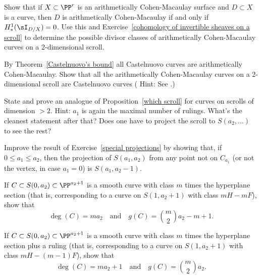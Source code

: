 \begin{exercise}
 Show that if $X\subset\PP^r$ is an arithmetically Cohen-Macaulay surface
and $D\subset X$ is a curve, then $D$ is arithmetically Cohen-Macaulay if and only if
$H^1_*(\sI_{D/X}) = 0$. Use this and Exercise~\ref{cohomology of invertible sheaves on a scroll} to determine the
possible divisor classes of arithmetically Cohen-Macaulay curves on a 2-dimensional scroll.
\end{exercise}

\begin{exercise}\label{Castelnuovo scrolls}
By Theorem~\ref{Castelnuovo's bound} all Castelnuovo curves are arithmetically Cohen-Macaulay.
Show that all the arithmetically Cohen-Macaulay curves on a 2-dimensional scroll are
Castelnuovo curves ( Hint: See \cite[Section 3c]{MR685427}.)
\end{exercise}


\begin{exercise}
State and prove an analogue of Proposition~\ref{which scroll} for curves on scrolls of dimension $>2$.
Hint: $a_1$ is again the maximal number of rulings. What's the cleanest statement after that? Does one have
to project the scroll to $S(a_2, \dots)$ to see the rest?
\end{exercise}


\begin{exercise}\label{general projections}
Improve the result of Exercise~\ref{special projections} by showing that, if $0\leq a_1\leq a_2$, then
 the projection of $S(a_1,a_2)$ from any point not on $C_{a_1}$ (or not the vertex, in case $a_1=0$) is 
 $S(a_1, a_2-1)$.
\end{exercise}


\begin{exercise}\label{curves on cones}
\item If $C \subset S(0, a_2) \subset \PP^{a_2+1}$ is a smooth curve with class $m$ times the hyperplane section (that is, corresponding to a curve on $S(1,a_2+1)$ with class $mH - mF$), show that
$$
\deg(C) = ma_2 \quad \text{and} \quad g(C) = \binom{m}{2}a_2 - m + 1.
$$
\item If $C \subset S(0, a_2) \subset \PP^{a_2+1}$ is a smooth curve with class $m$ times the hyperplane section plus a ruling (that is, corresponding to a curve on $S(1,a_2+1)$ with class $mH - (m-1)F$), show that
$$
\deg(C) = ma_2 + 1 \quad \text{and} \quad g(C) = \binom{m}{2}a_2.
$$
\end{exercise}

